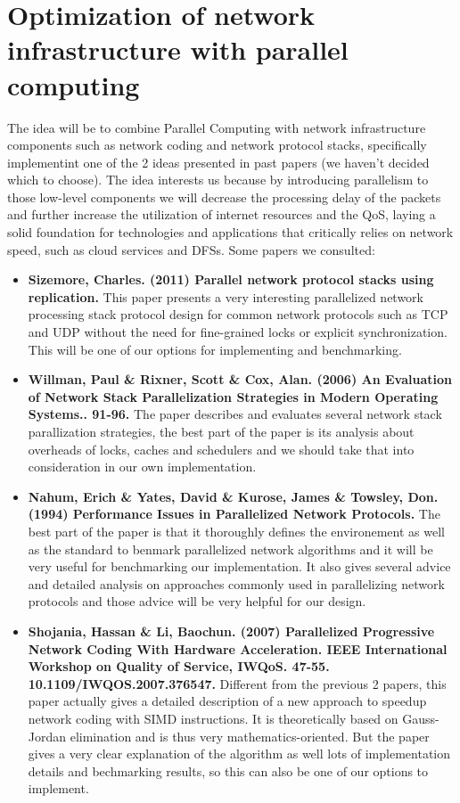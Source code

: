 \documentclass[11pt]{article}
\begin{document}
	\section{Optimization of network infrastructure with parallel computing}
	The idea will be to combine Parallel Computing with network infrastructure components such as network coding and network protocol stacks, specifically implementint one of the 2 ideas presented in past papers (we haven't decided which to choose). The idea interests us because by introducing parallelism to those low-level components we will decrease the processing delay of the packets and further increase the utilization of internet resources and the QoS, laying a solid foundation for technologies and applications that critically relies on network speed, such as cloud services and DFSs. Some papers we consulted:
	\begin{itemize}
		\item \textbf{Sizemore, Charles. (2011) Parallel network protocol stacks using replication. }This paper presents a very interesting parallelized network processing stack protocol design for common network protocols such as TCP and UDP without the need for fine-grained locks or explicit synchronization. This will be one of our options for implementing and benchmarking.
		\item \textbf{Willman, Paul \& Rixner, Scott \& Cox, Alan. (2006) An Evaluation of Network Stack Parallelization Strategies in Modern Operating Systems.. 91-96. } The paper describes and evaluates several network stack parallization strategies, the best part of the paper is its analysis about overheads of locks, caches and schedulers and we should take that into consideration in our own implementation.
		\item \textbf{Nahum, Erich \& Yates, David \& Kurose, James \& Towsley, Don. (1994) Performance Issues in Parallelized Network Protocols. } The best part of the paper is that it thoroughly defines the environement as well as the standard to benmark parallelized network algorithms and it will be very useful for benchmarking our implementation. It also gives several advice and detailed analysis on approaches commonly used in parallelizing network protocols and those advice will be very helpful for our design.
		\item \textbf{Shojania, Hassan \& Li, Baochun. (2007) Parallelized Progressive Network Coding With Hardware Acceleration. IEEE International Workshop on Quality of Service, IWQoS. 47-55. 10.1109/IWQOS.2007.376547. } Different from the previous 2 papers, this paper actually gives a detailed description of a new approach to speedup network coding with SIMD instructions. It is theoretically based on Gauss-Jordan elimination and is thus very mathematics-oriented. But the paper gives a very clear explanation of the algorithm as well lots of implementation details and bechmarking results, so this can also be one of our options to implement.
	\end{itemize} 
\end{document}
